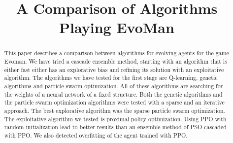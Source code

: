 \documentclass[conference]{IEEEtran}
\begin{document}
    \title{A Comparison of Algorithms Playing EvoMan}

    \author{
    \and
    \and
    }

    \maketitle

    \begin{abstract}
        This paper describes a comparison between algorithms for evolving agents for the game Evoman.
        We have tried a cascade ensemble method, starting with an algorithm that is either fast either has
        an explorative bias and refining its solution with an exploitative algorithm.
        The algorithms we have tested for the first stage are Q-learning, genetic algorithms and particle swarm optimization.
        All of these algorithms are searching for the weights of a neural network of a fixed structure.
        Both the genetic algorithms and the particle swarm optimization algorithms were tested with a sparse and
        an iterative approach.
        The best explorative algorithm was the sparse particle swarm optimization.
        The exploitative algorithm we tested is proximal policy optimization.
        Using PPO with random initialization lead to better results than an ensemble method of PSO cascaded with PPO\@.
        We also detected overfitting of the agent trained with PPO\@.
    \end{abstract}
\end{document}
